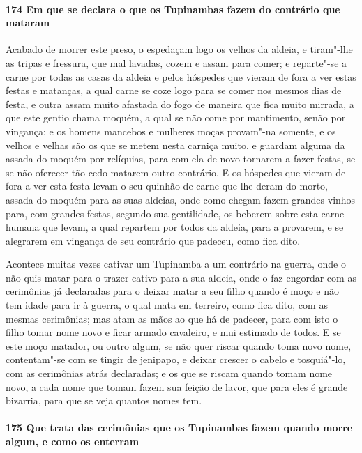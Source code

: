 \paragraph{174 Em que se declara o que os Tupinambas fazem do contrário que mataram}

Acabado de morrer este preso, o espedaçam logo os velhos da aldeia, e tiram"-lhe as tripas
e fressura, que mal lavadas, cozem e assam para comer; e reparte"-se a carne por todas as
casas da aldeia e pelos hóspedes que vieram de fora a ver estas festas e matanças, a qual
carne se coze logo para se comer nos mesmos dias de festa, e outra assam muito afastada do
fogo de maneira que fica muito mirrada, a que este gentio chama moquém, a qual se não come
por mantimento, senão por vingança; e os homens mancebos e mulheres moças provam"-na
somente, e os velhos e velhas são os que se metem nesta carniça muito, e guardam alguma da
assada do moquém por relíquias, para com ela de novo tornarem a fazer festas, se se não
oferecer tão cedo matarem outro contrário. E os hóspedes que vieram de fora a ver esta
festa levam o seu quinhão de carne que lhe deram do morto, assada do moquém para as suas
aldeias, onde como chegam fazem grandes vinhos para, com grandes festas, segundo sua
gentilidade, os beberem sobre esta carne humana que levam, a qual repartem por todos da
aldeia, para a provarem, e se alegrarem em vingança de seu contrário que padeceu, como
fica dito.

Acontece muitas vezes cativar um Tupinamba a um contrário na guerra, onde o não quis matar
para o trazer cativo para a sua aldeia, onde o faz engordar com as cerimônias já
declaradas para o deixar matar a seu filho quando é moço e não tem idade para ir à guerra,
o qual mata em terreiro, como fica dito, com as mesmas cerimônias; mas atam as mãos ao que
há de padecer, para com isto o filho tomar nome novo e ficar armado cavaleiro, e mui
estimado de todos. E se este moço matador, ou outro algum, se não quer riscar quando toma
novo nome, contentam"-se com se tingir de jenipapo, e deixar crescer o cabelo e tosquiá"-lo,
com as cerimônias atrás declaradas; e os que se riscam quando tomam nome novo, a cada nome
que tomam fazem sua feição de lavor, que para eles é grande bizarria, para que se veja
quantos nomes tem.

\paragraph{175 Que trata das cerimônias que os Tupinambas fazem quando morre algum, e como
os enterram}

